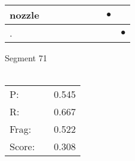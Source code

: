 \documentclass[landscape]{article}
\newcommand{\ssp}{\hspace{2pt}}
\newcommand{\mex}{\cellcolor{g}$\bullet$}
\begin{document}
\begin{tabular}{|l|p{10pt}|p{10pt}|p{10pt}|p{10pt}|p{10pt}|p{10pt}|p{10pt}|p{10pt}|}
\hline
\ssp \cellcolor{ref6}nozzle \ssp&\hspace{2pt}&\hspace{2pt}&\hspace{2pt}&\hspace{2pt}&\hspace{2pt}&\hspace{2pt}&\hspace{2pt}\mex&\hspace{2pt}\\
\hline
\ssp \cellcolor{ref7}. \ssp&\hspace{2pt}&\hspace{2pt}&\hspace{2pt}&\hspace{2pt}&\hspace{2pt}&\hspace{2pt}&\hspace{2pt}&\hspace{2pt}\mex\\
\hline
\end{tabular}

\vspace{6pt}
\noindent Segment 71\\\\
\noindent\begin{tabular}{lm{12pt}r}
\hline
P:&&0.545\\
R:&&0.667\\
Frag:&&0.522\\
Score:&&0.308\\
\end{tabular}

\newpage
\end{document}
